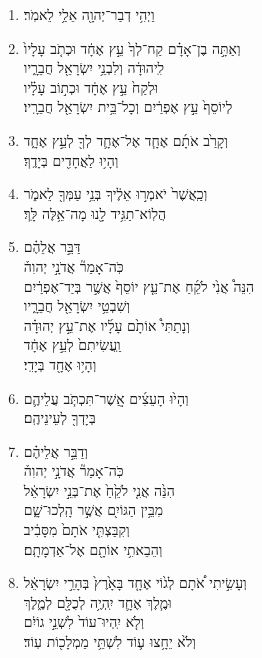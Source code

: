 \documentclass[12pt,a4paper,titlepage]{article}
\def \pscolor{red} %
\def \pslabelsep{0.3em} %
\def \psleftmargin{1em} %
\begin{document}
\begin{hebrew}
\begin{enumerate}[leftmargin=\psleftmargin, labelsep=\pslabelsep, label=\fontspec{Linux Libertine}\arabic*, font=\color{\pscolor}\small\textsuperscript, parsep=0em, itemsep=0em, topsep=0em]
          \subsection*{}
          \vspace{-0.6mm}
    \item וַיְהִ֥י דְבַר־יְהוָ֖ה אֵלַ֥י לֵאמֹֽר׃
    \item וְאַתָּ֣ה בֶן־אָדָ֗ם קַח־לְךָ֙ עֵ֣ץ אֶחָ֔ד וּכְתֹ֤ב עָלָיו֙ \\ לִֽיהוּדָ֔ה וְלִבְנֵ֥י יִשְׂרָאֵ֖ל חֲבֵרָ֑יו \\ וּלְקַח֙ עֵ֣ץ אֶחָ֔ד וּכְת֣וֹב עָלָ֗יו \\ לְיוֹסֵף֙ עֵ֣ץ אֶפְרַ֔יִם וְכָל־בֵּ֥ית יִשְׂרָאֵ֖ל חֲבֵרָֽיו׃
    \item וְקָרַ֙ב אֹתָ֜ם אֶחָ֧ד אֶל־אֶחָ֛ד לְךָ֖ לְעֵ֣ץ אֶחָ֑ד \\ וְהָי֥וּ לַאֲחָדִ֖ים בְּיָדֶֽךָ׃
    \item וְכַֽאֲשֶׁר֙ יֹאמְר֣וּ אֵלֶ֔יךָ בְּנֵ֥י עַמְּךָ֖ לֵאמֹ֑ר \\ הֲלֽוֹא־תַגִּ֥יד לָ֖נוּ מָה־אֵ֥לֶּה לָּֽךְ׃
    \item דַּבֵּ֣ר אֲלֵהֶ֗ם \\ כֹּֽה־אָמַר֘ אֲדֹנָ֣י יְהוִה֒ \\ הִנֵּה֩ אֲנִ֙י לֹקֵ֜חַ אֶת־עֵ֤ץ יוֹסֵף֙ אֲשֶׁ֣ר בְּיַד־אֶפְרַ֔יִם \\ וְשִׁבְטֵ֥י יִשְׂרָאֵ֖ל חֲבֵרָ֑יו \\ וְנָתַתִּי֩ אוֹתָ֙ם עָלָ֜יו אֶת־עֵ֣ץ יְהוּדָ֗ה \\ וַֽעֲשִׂיתִם֙ לְעֵ֣ץ אֶחָ֔ד \\ וְהָי֥וּ אֶחָ֖ד בְּיָדִֽי׃
    \item וְהָי֙וּ הָעֵצִ֜ים אֲֽשֶׁר־תִּכְתֹּ֧ב עֲלֵיהֶ֛ם \\ בְּיָדְךָ֖ לְעֵינֵיהֶֽם׃
    \item וְדַבֵּ֣ר אֲלֵיהֶ֗ם \\ כֹּֽה־אָמַר֘ אֲדֹנָ֣י יְהוִה֒ \\ הִנֵּ֙ה אֲנִ֤י לֹקֵ֙חַ֙ אֶת־בְּנֵ֣י יִשְׂרָאֵ֔ל \\ מִבֵּ֥ין הַגּוֹיִ֖ם אֲשֶׁ֣ר הָֽלְכוּ־שָׁ֑ם \\ וְקִבַּצְתִּ֤י אֹתָם֙ מִסָּבִ֔יב \\ וְהֵבֵאתִ֥י אוֹתָ֖ם אֶל־אַדְמָתָֽם׃
    \item וְעָשִׂ֣יתִי אֹ֠תָם לְג֙וֹי אֶחָ֤ד בָּאָ֙רֶץ֙ בְּהָרֵ֣י יִשְׂרָאֵ֔ל \\ וּמֶ֧לֶךְ אֶחָ֛ד יִֽהְיֶ֥ה לְכֻלָּ֖ם לְמֶ֑לֶךְ \\ וְלֹ֤א יִֽהְיוּ־עוֹד֙ לִשְׁנֵ֣י גוֹיִ֔ם \\ וְלֹ֙א יֵחָ֥צוּ ע֛וֹד לִשְׁתֵּ֥י מַמְלָכ֖וֹת עֽוֹד׃ \newpage

\end{enumerate}
\end{hebrew}
\end{document}
